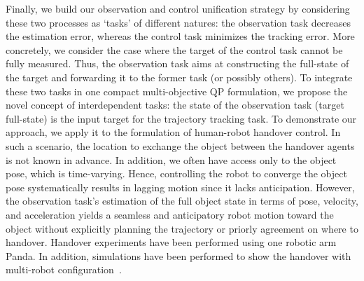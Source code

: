 Finally, we build our observation and control unification strategy by considering these two processes as ‘tasks’ of different natures: the observation task decreases the estimation error, whereas the control task minimizes the tracking error. More concretely, we consider the case where the target of the control task cannot be fully measured. Thus, the observation task aims at constructing the full-state of the target and forwarding it to the former task (or possibly others). To integrate these two tasks in one compact multi-objective QP formulation, we propose the novel concept of interdependent tasks: the state of the observation task (target full-state) is the input target for the trajectory tracking task. To demonstrate our approach, we apply it to the formulation of human-robot handover control. In such a scenario, the location to exchange the object between the handover agents is not known in advance. In addition, we often have access only to the object pose, which is time-varying. Hence, controlling the robot to converge the object pose systematically results in lagging motion since it lacks anticipation. However, the observation task's estimation of the full object state in terms of pose, velocity, and acceleration yields a seamless and anticipatory robot motion toward the object without explicitly planning the trajectory or priorly agreement on where to handover. Handover experiments have been performed using one robotic arm Panda. In addition, simulations have been performed to show the handover with multi-robot configuration~\cite{djeha2022arxiv}.

